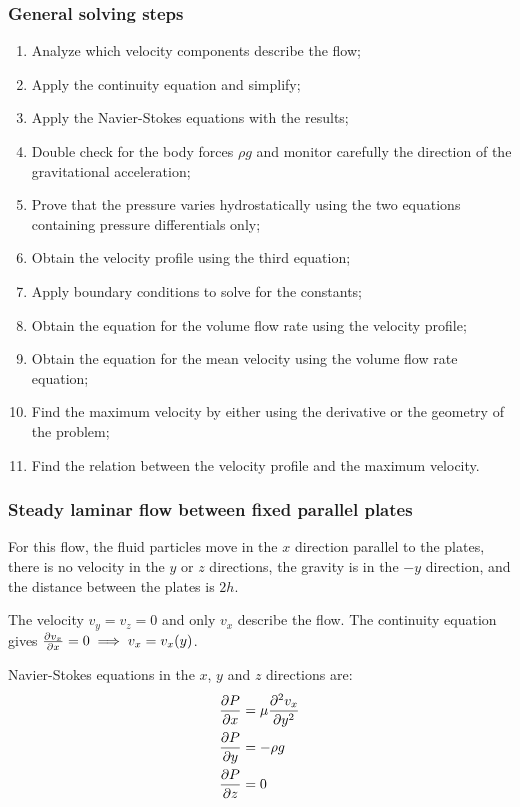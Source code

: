 \documentclass[10pt, twocolumn]{article}
\begin{document}
\subsubsection{General solving steps}
\begin{enumerate}
  \item Analyze which velocity components describe the flow;
  \item Apply the continuity equation and simplify;
  \item Apply the Navier-Stokes equations with the results;
  \item Double check for the body forces \(\rho g\) and monitor carefully the direction of the gravitational acceleration;
  \item Prove that the pressure varies hydrostatically using the two equations containing pressure differentials only;
  \item Obtain the velocity profile using the third equation;
  \item Apply boundary conditions to solve for the constants;
  \item Obtain the equation for the volume flow rate using the velocity profile;
  \item Obtain the equation for the mean velocity using the volume flow rate equation;
  \item Find the maximum velocity by either using the derivative or the geometry of the problem;
  \item Find the relation between the velocity profile and the maximum velocity.
\end{enumerate}


\subsubsection{Steady laminar flow between fixed parallel plates}
For this flow, the fluid particles move in the \(x\) direction parallel to the plates, there is no velocity in the \(y\) or \(z\) directions, the gravity is in the \(-y\) direction, and the distance between the plates is \(2h\).

The velocity \(v_y = v_z = 0\) and only \(v_x\) describe the flow.
The continuity equation gives \(\frac{\partial v_x}{\partial x} = 0 \implies v_x = v_x(y)\).

Navier-Stokes equations in the \(x\), \(y\) and \(z\) directions are:
\begin{align*}
  \frac{\partial P}{\partial x} & = \mu \frac{\partial^{2} v_x}{\partial y^{2}} \\
  \frac{\partial P}{\partial y} & = -\rho g                            \\
  \frac{\partial P}{\partial z} & = 0
\end{align*}
\end{document}
